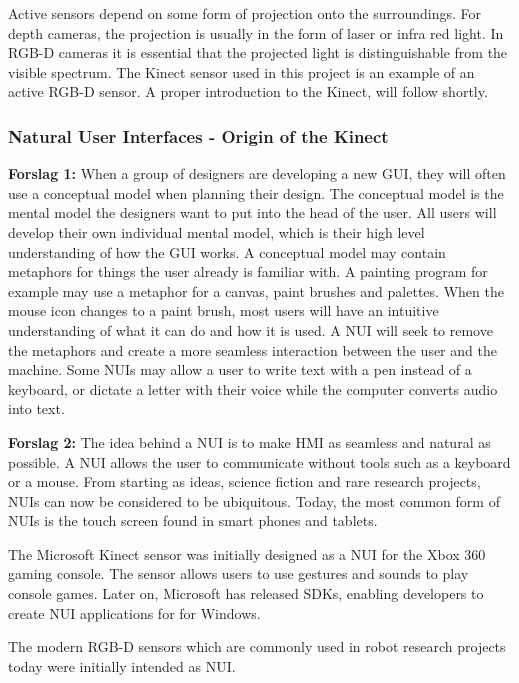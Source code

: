 Active sensors depend on some form of projection onto the surroundings. For depth cameras, the projection is usually in the form of laser or infra red light. In RGB-D cameras it is essential that the projected light is distinguishable from the visible spectrum. The Kinect sensor used in this project is an example of an active RGB-D sensor. A proper introduction to the Kinect, will follow shortly.

\subsubsection{Natural User Interfaces - Origin of the Kinect}

\textbf{Forslag 1:}
When a group of designers are developing a new \ac{GUI}, they will often use a conceptual model when planning their design. The conceptual model is the mental model the designers want to put into the head of the user. All users will develop their own individual mental model, which is their high level understanding of how the \ac{GUI} works. A conceptual model may contain metaphors for things  the user already is familiar with. A painting program for example may use a metaphor for a canvas, paint brushes and palettes. When the mouse icon changes to a paint brush, most users will have an intuitive understanding of what it can do and how it is used. A \ac{NUI} will seek to remove the metaphors and create a more seamless interaction between the user and the machine. Some \ac{NUI}s may allow a user to write text with a pen instead of a keyboard, or dictate a letter with their voice while the computer converts audio into text. 

\textbf{Forslag 2:}
The idea behind a \ac{NUI} is to make \ac{HMI} as seamless and natural as possible. A \ac{NUI} allows the user to communicate without tools such as a keyboard or a mouse. From starting as ideas, science fiction and rare research projects, \ac{NUI}s can now be considered to be ubiquitous. Today, the most common form of \ac{NUI}s is the touch screen found in smart phones and tablets. 

The Microsoft Kinect sensor was initially designed as a \ac{NUI} for the Xbox 360 gaming console. The sensor allows users to use gestures and sounds to play console games. Later on, Microsoft has released SDKs, enabling developers to create \ac{NUI} applications for for Windows. 

The modern RGB-D sensors which are commonly used in robot research projects today were initially intended as \ac{NUI}.

